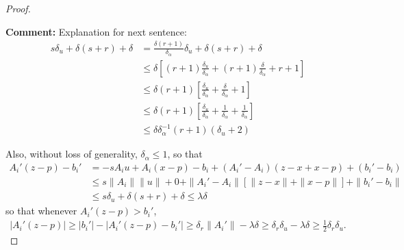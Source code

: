 \documentclass{article}
\newenvironment{comment}
  {\par\medskip
   \color{red}%
   \begin{framed}
   \textbf{Comment: }\ignorespaces}
 {\end{framed}
  \medskip}
\theoremstyle{case}
\numberwithin{theorem}{subsection}
\begin{document}
\begin{proof}
\begin{comment}
Explanation for next sentence:
\begin{align*}
s\delta_u + \delta \left(s + r\right) + \delta 
&= \frac{\delta(r + 1)}{\delta_{\alpha}}\delta_u + \delta \left(s + r\right) + \delta \\
&\le \delta \left[(r + 1)\frac{\delta_u}{\delta_{\alpha}} + (r+1)\frac{\delta}{\delta_{\alpha}} + r + 1\right] \\
&\le \delta (r + 1) \left[\frac{\delta_u}{\delta_{\alpha}} + \frac{\delta}{\delta_{\alpha}} + 1\right] \\
&\le \delta (r + 1) \left[\frac{\delta_u}{\delta_{\alpha}} + \frac{1}{\delta_{\alpha}} + \frac{1}{\delta_{\alpha}}\right] \\
&\le \delta \delta_{\alpha}^{-1}(r + 1) (\delta_u + 2)
\end{align*}
\end{comment}
Also, without loss of generality, $\delta_{\alpha} \le 1$, so that
\begin{align}
A_i'(z - p) - b_i' 
&= - s A_iu + A_i(x - p) - b_i + (A_i' - A_i)(z - x + x - p) + (b_i' - b_i) \nonumber \\
&\le s \|A_i\|\|u\| + 0 + \|A_i' - A_i\|\left[\|z - x\| + \|x - p\|\right] + \|b_i'-b_i\| \nonumber \\
&\le s\delta_u + \delta \left(s + r\right) + \delta \le \lambda \delta \label{reun_eqn1}
\end{align}
so that whenever $A_i'(z - p) > b_i'$,
\begin{align}
\left|A_i'(z - p)\right| 
\ge |b_i'| - \left| A_i'(z - p) - b_i'\right| 
\ge \delta_r\|A_i'\| - \lambda \delta 
\ge \delta_r \delta_u - \lambda \delta \ge \frac 1 2 \delta_r \delta_u. \label{reun_eqn2}
\end{align}




\end{proof}
\end{document}
